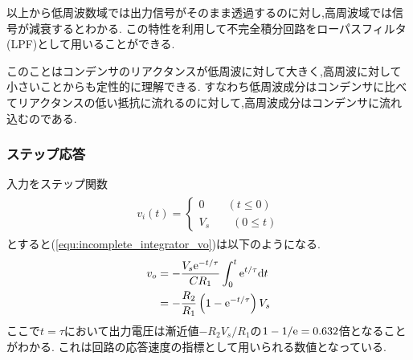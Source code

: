 以上から低周波数域では出力信号がそのまま透過するのに対し,高周波域では信号が減衰するとわかる.
この特性を利用して不完全積分回路をローパスフィルタ(LPF)として用いることができる.

このことはコンデンサのリアクタンスが低周波に対して大きく,高周波に対して小さいことからも定性的に理解できる.
すなわち低周波成分はコンデンサに比べてリアクタンスの低い抵抗に流れるのに対して,高周波成分はコンデンサに流れ込むのである.
\subsubsection{ステップ応答}
入力をステップ関数
\begin{align}
  \begin{split}
    v_i(t)=
    \begin{cases}
      0\qquad(t\leq 0)\\
      V_s\qquad(0\leq t)
    \end{cases}
  \end{split}
\end{align}
とすると(\ref{equ:incomplete_integrator_vo})は以下のようになる.
\begin{align}
  \begin{split}
    v_o&=-\frac{V_s{\rm e}^{-t/\tau}}{CR_1}\int^t_0{\rm e}^{t/\tau}{\rm d}t\\
    &=-\frac{R_2}{R_1}\left(1-{\rm e}^{-t/\tau}\right)V_s
  \end{split}
\end{align}
ここで$t=\tau$において出力電圧は漸近値$-R_2V_s/R_1$の$1-1/{\rm e}=0.632$倍となることがわかる.
これは回路の応答速度の指標として用いられる数値となっている.
